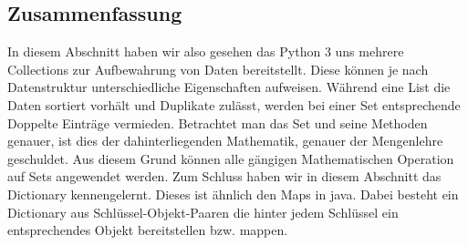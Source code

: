 \subsection{Zusammenfassung}
In diesem Abschnitt haben wir also gesehen das Python 3 uns mehrere Collections zur Aufbewahrung von Daten bereitstellt. Diese können je nach Datenstruktur unterschiedliche Eigenschaften aufweisen. Während eine List die Daten sortiert vorhält und Duplikate zulässt, werden bei einer Set entsprechende Doppelte Einträge vermieden. Betrachtet man das Set und seine Methoden genauer, ist dies der dahinterliegenden Mathematik, genauer der Mengenlehre geschuldet. Aus diesem Grund können alle gängigen Mathematischen Operation auf Sets angewendet werden. Zum Schluss haben wir in diesem Abschnitt das Dictionary kennengelernt. Dieses ist ähnlich den Maps in java. Dabei besteht ein Dictionary aus Schlüssel-Objekt-Paaren die hinter jedem Schlüssel ein entsprechendes Objekt bereitstellen bzw. mappen.
